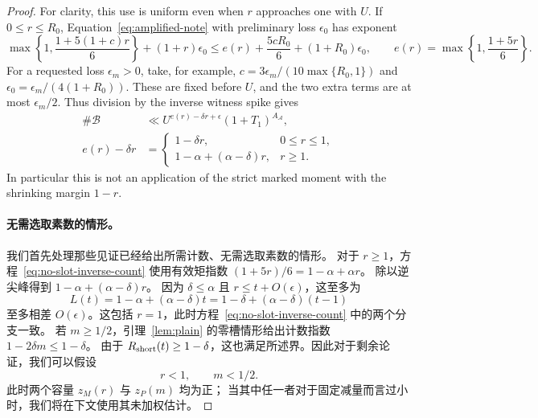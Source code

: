 \documentclass[11pt,a4paper]{article}
\numberwithin{equation}{section}
\numberwithin{figure}{section}
\theoremstyle{definition}
\theoremstyle{remark}
\begin{document}
\begin{proof}
For clarity, this use is uniform even when \(r\) approaches one
with \(U\).  If \(0\le r\le R_0\), Equation~\eqref{eq:amplified-note}
with preliminary loss \(\epsilon_0\) has exponent
\[
 \max\left\{1,\frac{1+5(1+c)r}{6}\right\}
       +(1+r)\epsilon_0
 \le e(r)+\frac{5cR_0}{6}+(1+R_0)\epsilon_0,
 \qquad e(r)=\max\left\{1,\frac{1+5r}{6}\right\}.
\]
For a requested loss \(\epsilon_m>0\), take, for example,
\(c=3\epsilon_m/(10\max\{R_0,1\})\) and
\(\epsilon_0=\epsilon_m/(4(1+R_0))\).  These are fixed before
\(U\), and the two extra terms are at most \(\epsilon_m/2\).
Thus division by the inverse witness spike gives
\begin{equation}\label{eq:no-slot-inverse-count}
 \begin{aligned}
 \#\mathcal B&\ll
 U^{e(r)-\delta r+\epsilon}(1+T_1)^{A_{\mathcal A}},\\
 e(r)-\delta r&=
 \begin{cases}
  1-\delta r,&0\le r\le1,\\
  1-\alpha+(\alpha-\delta)r,&r\ge1.
 \end{cases}
 \end{aligned}
\end{equation}
In particular this is not an application of the strict marked
moment with the shrinking margin \(1-r\).\paragraph{无需选取素数的情形。}
我们首先处理那些见证已经给出所需计数、无需选取素数的情形。
对于 \(r\ge1\)，方程~\eqref{eq:no-slot-inverse-count} 使用有效矩指数 \((1+5r)/6=1-\alpha+\alpha r\)。
除以逆尖峰得到
\(1-\alpha+(\alpha-\delta)r\)。
因为 \(\delta\le\alpha\) 且 \(r\le t+O(\epsilon)\)，这至多为
\begin{equation}
 L(t)=1-\alpha+(\alpha-\delta)t
     =1-\delta+(\alpha-\delta)(t-1)
 \label{eq:long-count}
\end{equation}
至多相差 \(O(\epsilon)\)。这包括 \(r=1\)，此时方程~\eqref{eq:no-slot-inverse-count} 中的两个分支一致。
若 \(m\ge1/2\)，引理~\ref{lem:plain} 的零槽情形给出计数指数 \(1-2\delta m\le1-\delta\)。
由于 \(R_{\rm short}(t)\ge1-\delta\)，这也满足所述界。因此对于剩余论证，我们可以假设
\[
 r<1,\qquad m<1/2.
\]
此时两个容量 \(z_M(r)\) 与 \(z_P(m)\) 均为正；
当其中任一者对于固定减量而言过小时，我们将在下文使用其未加权估计。


\end{proof}
\end{document}

